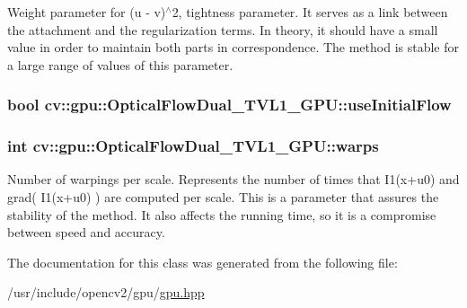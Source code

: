 Weight parameter for (u -\/ v)$^\wedge$2, tightness parameter. It serves as a link between the attachment and the regularization terms. In theory, it should have a small value in order to maintain both parts in correspondence. The method is stable for a large range of values of this parameter. \hypertarget{classcv_1_1gpu_1_1OpticalFlowDual__TVL1__GPU_af17da8e422347e60a6a8968b566e3634}{
\subsubsection[{use\-Initial\-Flow}]{\setlength{\rightskip}{0pt plus 5cm}bool cv\-::gpu\-::\-Optical\-Flow\-Dual\-\_\-\-T\-V\-L1\-\_\-\-G\-P\-U\-::use\-Initial\-Flow}}\label{classcv_1_1gpu_1_1OpticalFlowDual__TVL1__GPU_af17da8e422347e60a6a8968b566e3634}
\hypertarget{classcv_1_1gpu_1_1OpticalFlowDual__TVL1__GPU_a7a77936582247a180bf0cfbb55f7875c}{
\subsubsection[{warps}]{\setlength{\rightskip}{0pt plus 5cm}int cv\-::gpu\-::\-Optical\-Flow\-Dual\-\_\-\-T\-V\-L1\-\_\-\-G\-P\-U\-::warps}}\label{classcv_1_1gpu_1_1OpticalFlowDual__TVL1__GPU_a7a77936582247a180bf0cfbb55f7875c}
Number of warpings per scale. Represents the number of times that I1(x+u0) and grad( I1(x+u0) ) are computed per scale. This is a parameter that assures the stability of the method. It also affects the running time, so it is a compromise between speed and accuracy. 

The documentation for this class was generated from the following file\-:\begin{DoxyCompactItemize}
\item 
/usr/include/opencv2/gpu/\hyperlink{gpu_2gpu_8hpp}{gpu.\-hpp}\end{DoxyCompactItemize}
